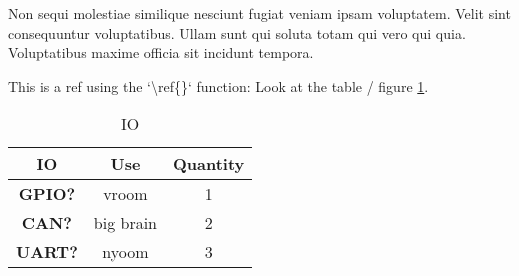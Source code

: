 
Non sequi molestiae similique nesciunt fugiat veniam ipsam voluptatem. Velit sint consequuntur voluptatibus. Ullam sunt qui soluta totam qui vero qui quia. Voluptatibus maxime officia sit incidunt tempora.

This is a ref using the `\textbackslash ref\{\}` function: Look at the table / figure \ref{tab_io}.

\begin{table}[H]
\centering
\begin{tabular}{|c|c|c|}
\hline
\textbf{IO}     &   \textbf{Use}    &   \textbf{Quantity}   \\ \hline
\textbf{GPIO?}  &	vroom           &	1                   \\ \hline
\textbf{CAN?}   &   big brain       &	2                   \\ \hline
\textbf{UART?}  &	nyoom	        &	3                   \\ \hline
\end{tabular}
\caption{IO}
\label{tab_io}
\end{table}
